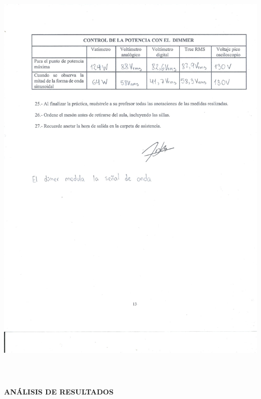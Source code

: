 \documentclass[12pt]{article}
\begin{document}
	\includegraphics[width=16cm,height=21cm]{Img/Resultados_10}\\
	
	\newpage
	
	\begin{center}
		\textbf{\large ANÁLISIS DE RESULTADOS}\\
	\end{center}
	
	\renewcommand{\theenumi}{\alph{enumi}} %
	
\end{document}
